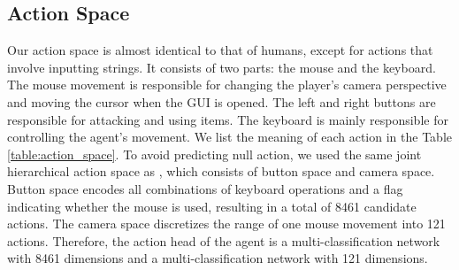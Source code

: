\documentclass[11pt, a4paper, logo, one column]{craftjarvis}
\begin{document}
\subsection{Action Space} \fancyfoot[L]{}
Our action space is almost identical to that of humans, except for actions that involve inputting strings. It consists of two parts: the mouse and the keyboard. The mouse movement is responsible for changing the player's camera perspective and moving the cursor when the GUI is opened. The left and right buttons are responsible for attacking and using items. The keyboard is mainly responsible for controlling the agent's movement. We list the meaning of each action in the Table \ref{table:action_space}. To avoid predicting null action, we used the same joint hierarchical action space as \cite{vpt}, which consists of button space and camera space. Button space encodes all combinations of keyboard operations and a flag indicating whether the mouse is used, resulting in a total of 8461 candidate actions. The camera space discretizes the range of one mouse movement into 121 actions. Therefore, the action head of the agent is a multi-classification network with 8461 dimensions and a multi-classification network with 121 dimensions. 
\end{document}
